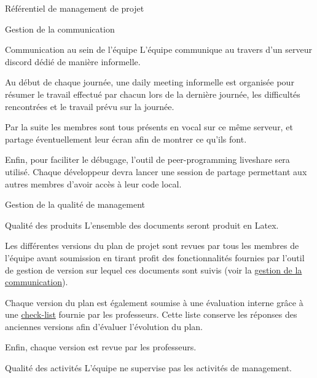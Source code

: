 \documentclass[]{article}
\begin{document}
{\begin{section}{\label{sec:Référentiel de management de projet}Référentiel de management de projet}
\begin{subsection}{\label{sec:Gestion de la communication}Gestion de la communication}
         \newpage

         \begin{subsubsection}{\label{sec:Communication au sein de l'équipe}Communication au sein de l'équipe}
             L’équipe communique au travers d’un serveur discord dédié de manière informelle.

             Au début de chaque journée, une daily meeting informelle est organisée pour résumer le travail effectué par chacun lors de la dernière journée, les difficultés rencontrées et le travail prévu sur la journée.

             Par la suite les membres sont tous présents en vocal sur ce même serveur, et partage éventuellement leur écran afin de montrer ce qu’ils font.

             Enfin, pour faciliter le débugage, l’outil de peer-programming liveshare sera utilisé. Chaque développeur devra lancer une session de partage permettant aux autres membres d’avoir accès à leur code local.
         \end{subsubsection}
     \end{subsection}

     \begin{subsection}{\label{sec:Gestion de la qualité de management}Gestion de la qualité de management}
         \begin{subsubsection}{\label{sec:Qualité des produits}Qualité des produits}
            L'ensemble des documents seront produit en Latex.

             Les différentes versions du plan de projet sont revues par tous les membres de l’équipe avant soumission en tirant profit des fonctionnalités fournies par l'outil de gestion de version sur lequel ces documents sont suivis (voir la \hyperref[sec:Communication avec les parties prenantes]{gestion de la communication}).

             Chaque version du plan est également soumise à une évaluation interne grâce à une \href{Check_list.ods}{check-list} fournie par les professeurs. Cette liste conserve les réponses des anciennes versions afin d’évaluer l’évolution du plan.

             Enfin, chaque version est revue par les professeurs.
         \end{subsubsection}

         \begin{subsubsection}{\label{sec:Qualité des activités}Qualité des activités}
             L’équipe ne supervise pas les activités de management.
         \end{subsubsection}
     \end{subsection}


\end{section}}
\end{document}
